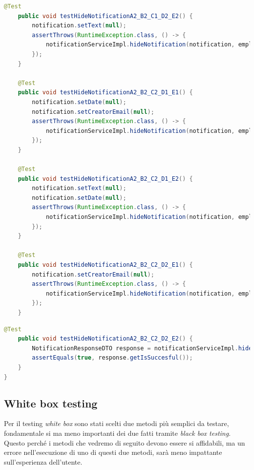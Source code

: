 \begin{lstlisting}[language=java]
    @Test
    public void testHideNotificationA2_B2_C1_D2_E2() {
        notification.setText(null);
        assertThrows(RuntimeException.class, () -> {
            notificationServiceImpl.hideNotification(notification, employee);
        });
    }

    @Test
    public void testHideNotificationA2_B2_C2_D1_E1() {
        notification.setDate(null);
        notification.setCreatorEmail(null);
        assertThrows(RuntimeException.class, () -> {
            notificationServiceImpl.hideNotification(notification, employee);
        });
    }

    @Test
    public void testHideNotificationA2_B2_C2_D1_E2() {
        notification.setText(null);
        notification.setDate(null);
        assertThrows(RuntimeException.class, () -> {
            notificationServiceImpl.hideNotification(notification, employee);
        });
    }

    @Test
    public void testHideNotificationA2_B2_C2_D2_E1() {
        notification.setCreatorEmail(null);
        assertThrows(RuntimeException.class, () -> {
            notificationServiceImpl.hideNotification(notification, employee);
        });
    }
\end{lstlisting}
\newpage
\begin{lstlisting}[language=java]
    @Test
    public void testHideNotificationA2_B2_C2_D2_E2() {
        NotificationResponseDTO response = notificationServiceImpl.hideNotification(notification, employee);
        assertEquals(true, response.getIsSuccesful());
    }
}
\end{lstlisting}
\subsection{White box testing}
Per il testing \textit{white box} sono stati scelti due metodi più semplici da testare, fondamentale si ma meno importanti dei due fatti tramite \textit{black box testing}. Questo perché i metodi che vedremo di seguito devono essere si affidabili, ma un errore nell'esecuzione di uno di questi due metodi, sarà meno impattante sull'esperienza dell'utente.
